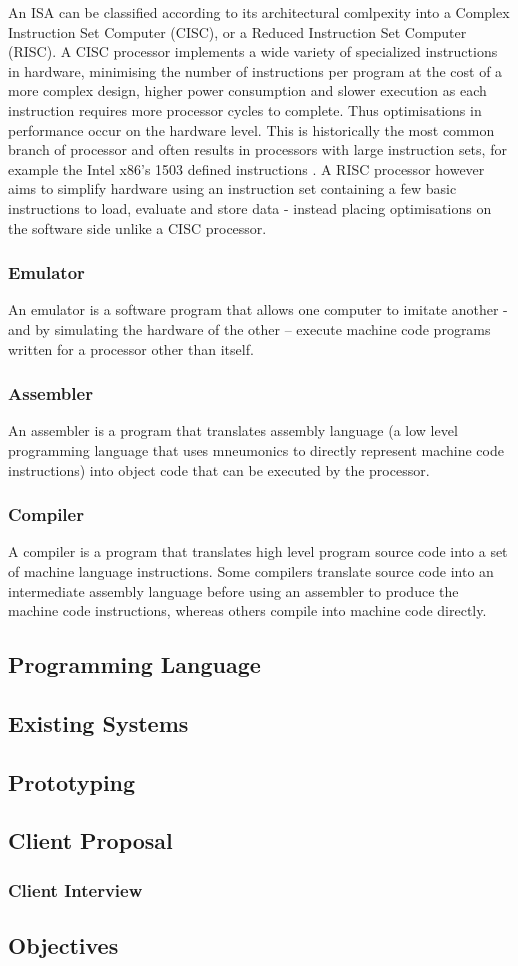 An ISA can be classified according to its architectural comlpexity into a Complex Instruction Set Computer (CISC), or a Reduced Instruction Set Computer (RISC). A CISC processor implements a wide variety of specialized instructions in hardware, minimising the number of instructions per program at the cost of a more complex design, higher power consumption and slower execution as each instruction requires more processor cycles to complete. \textcite{gfg-risc-vs-cisc} Thus optimisations in performance occur on the hardware level. This is historically the most common branch of processor and often results in processors with large instruction sets, for example the Intel x86's 1503 defined instructions \textcite{ryg-blog}. A RISC processor however aims to simplify hardware using an instruction set containing a few basic instructions to load, evaluate and store data - instead placing optimisations on the software side unlike a CISC processor. 

\subsubsection{Emulator}
\label{sec:Emulator}
An emulator is a software program that allows one computer to imitate another - and by simulating the hardware of the other – execute machine code programs written for a processor other than itself.

\subsubsection{Assembler}
\label{sec:Assembler}
An assembler is a program that translates assembly language (a low level programming language that uses mneumonics to directly represent machine code instructions) into object code that can be executed by the processor. 

\subsubsection{Compiler}
\label{sec:Compiler}
A compiler is a program that translates high level program source code into a set of machine language instructions. Some compilers translate source code into an intermediate assembly language before using an assembler to produce the machine code instructions, whereas others compile into machine code directly.

\subsection{Programming Language}
\subsection{Existing Systems}
\subsection{Prototyping}
\subsection{Client Proposal}
\subsubsection{Client Interview}
\subsection{Objectives}